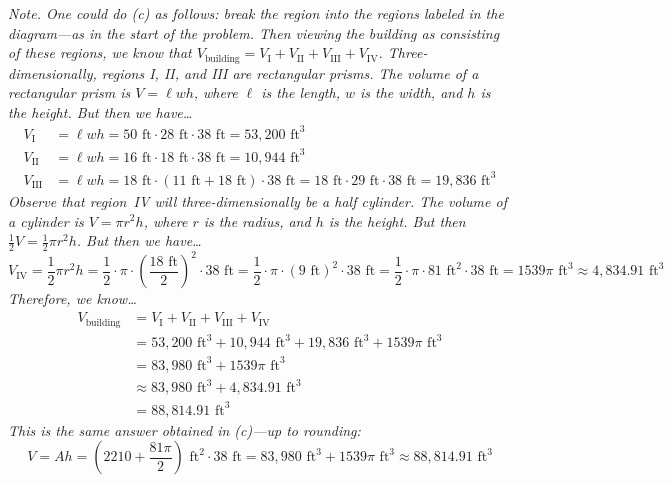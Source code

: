 \documentclass[11pt,letterpaper]{article}
\begin{document}
\newpage 

{\itshape Note. One could do (c) as follows: break the region into the regions labeled in the diagram---as in the start of the problem. Then viewing the building as consisting of these regions, we know that $V_{\text{building}}= V_{\text{I}} + V_{\text{II}} + V_{\text{III}} + V_{\text{IV}}$. Three-dimensionally, regions I, II, and III are rectangular prisms. The volume of a rectangular prism is $V= \ell w h$, where $\ell$ is the length, $w$ is the width, and $h$ is the height. But then we have\dots
	\[
	\begin{aligned}
	V_{\text{I}}&= \ell w h= 50 \text{ ft} \cdot 28 \text{ ft} \cdot 38 \text{ ft}= 53,\!200 \text{ ft}^3 \\
	V_{\text{II}}&= \ell w h= 16 \text{ ft} \cdot 18 \text{ ft} \cdot 38 \text{ ft}= 10,\!944 \text{ ft}^3 \\
	V_{\text{III}}&= \ell w h= 18 \text{ ft} \cdot (11 \text{ ft} + 18 \text{ ft}) \cdot 38 \text{ ft}= 18 \text{ ft} \cdot 29 \text{ ft} \cdot 38 \text{ ft}= 19,\!836 \text{ ft}^3 
	\end{aligned}
	\]
Observe that region~IV will three-dimensionally be a half cylinder. The volume of a cylinder is $V= \pi r^2 h$, where $r$ is the radius, and $h$ is the height. But then $\frac{1}{2}V= \frac{1}{2} \pi r^2 h$. But then we have\dots
	\[
	V_{\text{IV}}= \dfrac{1}{2} \pi r^2 h= \dfrac{1}{2} \cdot \pi \cdot \left( \dfrac{18 \text{ ft}}{2} \right)^2 \cdot 38 \text{ ft}= \dfrac{1}{2} \cdot \pi \cdot (9 \text{ ft})^2 \cdot 38 \text{ ft}= \dfrac{1}{2} \cdot \pi \cdot 81 \text{ ft}^2 \cdot 38 \text{ ft}= 1539 \pi \text{ ft}^3 \approx 4,\!834.91 \text{ ft}^3
	\]
Therefore, we know\dots
	\[
	\begin{aligned}
	V_{\text{building}}&= V_{\text{I}} + V_{\text{II}} + V_{\text{III}} + V_{\text{IV}} \\[0.3cm]
	&= 53,\!200 \text{ ft}^3 + 10,\!944 \text{ ft}^3 + 19,\!836 \text{ ft}^3 + 1539 \pi \text{ ft}^3 \\[0.3cm]
	&= 83,\!980 \text{ ft}^3 + 1539 \pi \text{ ft}^3 \\[0.3cm]
	&\approx 83,\!980 \text{ ft}^3 + 4,\!834.91 \text{ ft}^3 \\[0.3cm]
	&= 88,\!814.91 \text{ ft}^3
	\end{aligned}
	\]
This is the same answer obtained in (c)---up to rounding:
	\[
	V= Ah= \left( 2210 + \frac{81 \pi}{2} \right) \text{ ft}^2 \cdot 38 \text{ ft}= 83,\!980 \text{ ft}^3 + 1539 \pi \text{ ft}^3 \approx 88,\!814.91 \text{ ft}^3
	\]
}
\end{document}
